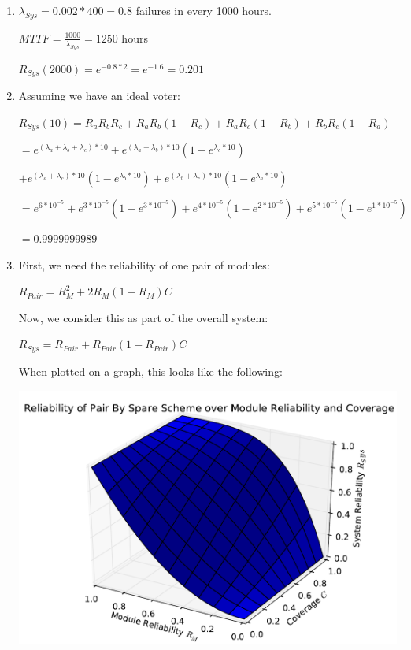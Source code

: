 \documentclass[a4paper,12pt]{article}
\begin{document}
\begin{enumerate}
        \item $\lambda_{Sys} = 0.002 * 400 = 0.8$ failures in every 1000 hours.

        $MTTF = \frac{1000}{\lambda_{Sys}} = 1250$ hours

        $R_{Sys}(2000) = e^{-0.8 * 2} = e^{-1.6} = 0.201$

        \item Assuming we have an ideal voter:

        $R_{Sys}(10) = R_aR_bR_c + R_aR_b(1 - R_c) + R_aR_c(1 - R_b) + R_bR_c(1 - R_a)$

        $= e^{(\lambda_a + \lambda_b + \lambda_c)*10} + e^{(\lambda_a + \lambda_b)*10}(1 - e^{\lambda_c*10})$

        $+ e^{(\lambda_a + \lambda_c)*10}(1 - e^{\lambda_b*10}) + e^{(\lambda_b + \lambda_c)*10}(1 - e^{\lambda_a*10})$

        $= e^{6*10^{-5}} + e^{3*10^{-5}}(1 - e^{3*10^{-5}}) + e^{4*10^{-5}}(1 - e^{2*10^{-5}}) + e^{5*10^{-5}}(1 - e^{1*10^{-5}})$

        $ = 0.9999999989$

        \item First, we need the reliability of one pair of modules:

        $R_{Pair} = R_M^2 + 2R_M(1 - R_M)C$

        Now, we consider this as part of the overall system:

        $R_{Sys} = R_{Pair} + R_{Pair}(1 - R_{Pair})C$

        When plotted on a graph, this looks like the following:

        \begin{center}
            \includegraphics[scale=0.7]{question_6_graph}
        \end{center}


\end{enumerate}
\end{document}
